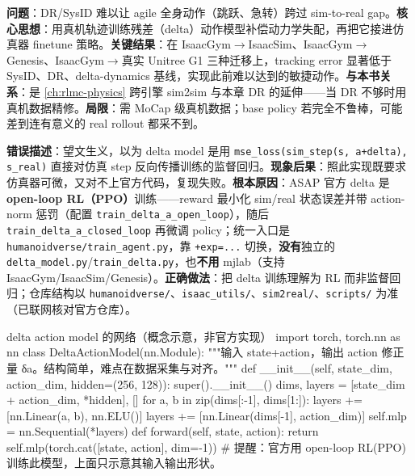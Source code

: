 \begin{paper}\label{paper:rlmc-dr-asap}
\textbf{问题}：DR/SysID 难以让 agile 全身动作（跳跃、急转）跨过 sim-to-real gap。\textbf{核心思想}：用真机轨迹训练残差（delta）动作模型补偿动力学失配，再把它接进仿真器 finetune 策略。\textbf{关键结果}：在 IsaacGym$\to$IsaacSim、IsaacGym$\to$Genesis、IsaacGym$\to$真实 Unitree G1 三种迁移上，tracking error 显著低于 SysID、DR、delta-dynamics 基线，实现此前难以达到的敏捷动作。\textbf{与本书关系}：是 \cref{ch:rlmc-physics} 跨引擎 sim2sim 与本章 DR 的延伸——当 DR 不够时用真机数据精修。\textbf{局限}：需 MoCap 级真机数据；base policy 若完全不鲁棒，可能差到连有意义的 real rollout 都采不到。
\end{paper}

\begin{pitfall}
\textbf{错误描述}：望文生义，以为 delta model 是用 \verb|mse_loss(sim_step(s, a+delta), s_real)| 直接对仿真 step 反向传播训练的监督回归。\textbf{现象后果}：照此实现既要求仿真器可微，又对不上官方代码，复现失败。\textbf{根本原因}：ASAP 官方 delta 是 \textbf{open-loop RL（PPO）}训练——reward 最小化 sim/real 状态误差并带 action-norm 惩罚（配置 \verb|train_delta_a_open_loop|），随后 \verb|train_delta_a_closed_loop| 再微调 policy；统一入口是 \verb|humanoidverse/train_agent.py|，靠 \verb|+exp=...| 切换，\textbf{没有}独立的 \verb|delta_model.py|/\verb|train_delta.py|，也\textbf{不用} mjlab（支持 IsaacGym/IsaacSim/Genesis）。\textbf{正确做法}：把 delta 训练理解为 RL 而非监督回归；仓库结构以 \verb|humanoidverse/|、\verb|isaac_utils/|、\verb|sim2real/|、\verb|scripts/| 为准（已联网核对官方仓库）。
\end{pitfall}

\begin{codebox}[Python]{delta action model 的网络（概念示意，非官方实现）}
import torch, torch.nn as nn
class DeltaActionModel(nn.Module):
    """输入 state+action，输出 action 修正量 δa。结构简单，难点在数据采集与对齐。"""
    def __init__(self, state_dim, action_dim, hidden=(256, 128)):
        super().__init__()
        dims, layers = [state_dim + action_dim, *hidden], []
        for a, b in zip(dims[:-1], dims[1:]):
            layers += [nn.Linear(a, b), nn.ELU()]
        layers += [nn.Linear(dims[-1], action_dim)]
        self.mlp = nn.Sequential(*layers)
    def forward(self, state, action):
        return self.mlp(torch.cat([state, action], dim=-1))
# 提醒：官方用 open-loop RL(PPO) 训练此模型，上面只示意其输入输出形状。
\end{codebox}

